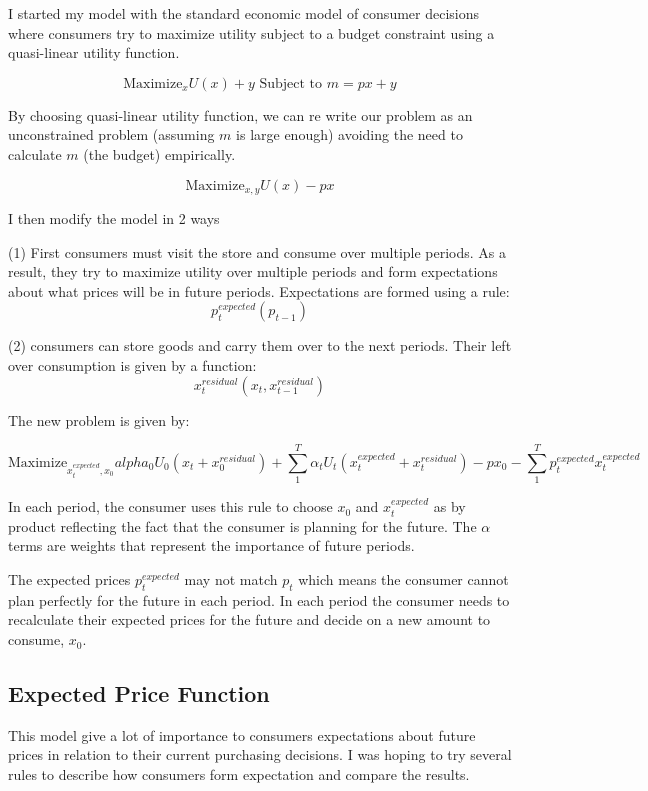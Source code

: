 \documentclass{article}
\begin{document}
I started my model with the standard economic model of consumer decisions where consumers try to maximize utility subject to a budget constraint using a quasi-linear utility function.

$$\text{Maximize}_{x} U(x) + y  \text{ Subject to } m = px + y $$

By choosing quasi-linear utility function, we can re write our problem as an unconstrained problem (assuming $m$ is large enough) avoiding the need to calculate $m$ (the budget) empirically. 

$$\text{Maximize}_{x,y} U(x) -px $$

I then modify the model in 2 ways

(1) First consumers must visit the store and consume over multiple periods. As a result, they try to maximize utility over multiple periods and form expectations about what prices will be in future periods. Expectations are formed using a rule: $$p^{expected}_t(p_{t-1})$$

(2) consumers can store goods and carry them over to the next periods. Their left over consumption is given by a function: $$x^{residual}_t(x_t,x^{residual}_{t-1})$$

The new problem is given by:

$$ \text{Maximize}_{x^{expected}_t,x_0} alpha_0 U_0(x_t +x^{residual}_0) + \sum_1^T \alpha_t U_t(x^{expected}_t+x^{residual}_{t}) - px_0 - \sum_1^T p^{expected}_t x^{expected}_t $$

In each period, the consumer uses this rule to choose $x_0$ and $x^{expected}_t$ as by product reflecting the fact that the consumer is planning for the future. The $\alpha$ terms are weights that represent the importance of future periods.

The expected prices $p^{expected}_t$ may not match $p_t$ which means the consumer cannot plan perfectly for the future in each period. In each period the consumer needs to recalculate their expected prices for the future and decide on a new amount to consume, $x_0$.

\subsection{Expected Price Function}

This model give a lot of importance to consumers expectations about future prices in relation to their current purchasing decisions. I was hoping to try several rules to describe how consumers form expectation and compare the results.
\end{document}
